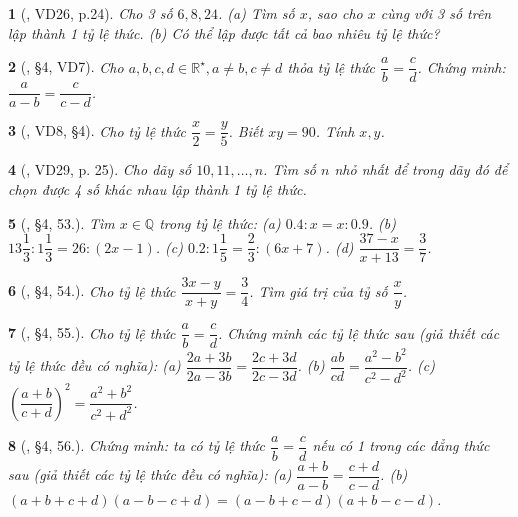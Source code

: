 \documentclass{article}
\newtheorem{baitoan}{}
\begin{document}
\begin{baitoan}[\cite{Binh_Toan_7_tap_1}, VD26, p.24]
	Cho 3 số $6,8,24$. (a) Tìm số $x$, sao cho $x$ cùng với 3 số trên lập thành 1 tỷ lệ thức. (b) Có thể lập được tất cả bao nhiêu tỷ lệ thức?
\end{baitoan}

\begin{baitoan}[\cite{Binh_Toan_7_tap_1}, \S4, VD7]
	Cho $a,b,c,d\in\mathbb{R}^\star,a\ne b,c\ne d$ thỏa tỷ lệ thức $\dfrac{a}{b} = \dfrac{c}{d}$. Chứng minh: $\dfrac{a}{a - b} = \dfrac{c}{c - d}$.
\end{baitoan}

\begin{baitoan}[\cite{Binh_Toan_7_tap_1}, VD8, \S4]
	Cho tỷ lệ thức $\dfrac{x}{2} = \dfrac{y}{5}$. Biết $xy = 90$. Tính $x,y$.
\end{baitoan}

\begin{baitoan}[\cite{Binh_Toan_7_tap_1}, VD29, p. 25]
	Cho dãy số $10,11,\ldots,n$. Tìm số $n$ nhỏ nhất để trong dãy đó để chọn được 4 số khác nhau lập thành 1 tỷ lệ thức.
\end{baitoan}

\begin{baitoan}[\cite{Binh_Toan_7_tap_1}, \S4, 53.]
	Tìm $x\in\mathbb{Q}$ trong tỷ lệ thức: (a) $0.4:x = x:0.9$. (b) $13\dfrac{1}{3}:1\dfrac{1}{3} = 26:(2x - 1)$. (c) $0.2:1\dfrac{1}{5} = \dfrac{2}{3}:(6x + 7)$. (d) $\dfrac{37 - x}{x + 13} = \dfrac{3}{7}$.	
\end{baitoan}

\begin{baitoan}[\cite{Binh_Toan_7_tap_1}, \S4, 54.]
	Cho tỷ lệ thức $\dfrac{3x - y}{x + y} = \dfrac{3}{4}$. Tìm giá trị của tỷ số $\dfrac{x}{y}$.
\end{baitoan}

\begin{baitoan}[\cite{Binh_Toan_7_tap_1}, \S4, 55.]
	Cho tỷ lệ thức $\dfrac{a}{b} = \dfrac{c}{d}$. Chứng minh các tỷ lệ thức sau (giả thiết các tỷ lệ thức đều có nghĩa): (a) $\dfrac{2a + 3b}{2a - 3b} = \dfrac{2c + 3d}{2c - 3d}$. (b) $\dfrac{ab}{cd} = \dfrac{a^2 - b^2}{c^2 - d^2}$. (c) $\left(\dfrac{a + b}{c + d}\right)^2 = \dfrac{a^2 + b^2}{c^2 + d^2}$.	
\end{baitoan}

\begin{baitoan}[\cite{Binh_Toan_7_tap_1}, \S4, 56.]
	Chứng minh: ta có tỷ lệ thức $\dfrac{a}{b} = \dfrac{c}{d}$ nếu có 1 trong các đẳng thức sau (giả thiết các tỷ lệ thức đều có nghĩa): (a) $\dfrac{a + b}{a - b} = \dfrac{c + d}{c - d}$. (b) $(a + b + c + d)(a - b - c + d) = (a - b + c - d)(a + b - c - d)$.	
\end{baitoan}
\end{document}
